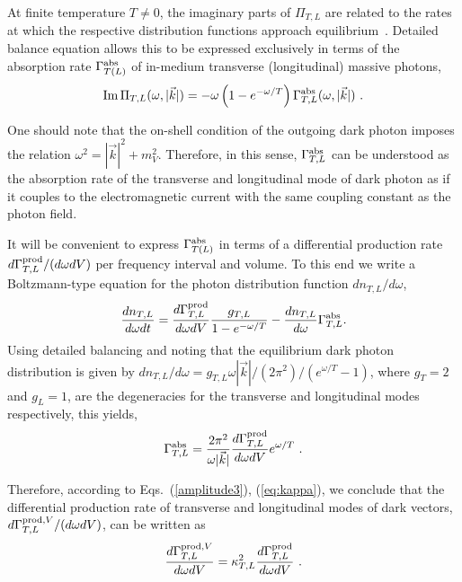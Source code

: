 \documentclass[12pt]{article}
\DeclareMathOperator{\imag}{Im}
\begin{document}
At finite temperature $T\neq 0$, the imaginary parts of $\Pi_{T,L}$
are related to the rates at which the respective distribution
functions approach equilibrium~\cite{Weldon:1983jn}. Detailed
balance equation allows this to be expressed exclusively in terms of the
absorption rate $\Gamma^{\rm abs}_{T(L)}$  of in-medium transverse (longitudinal) massive photons,
\begin{equation}\label{eq:impi}
\imag \Pi_{T,L} (\omega,|\vec k|) = -\omega\left(1-e^{-\omega/T}\right)\Gamma^{\rm abs}_{T,L}(\omega,|\vec k|) \ .
\end{equation}

One should note that the on-shell condition of the outgoing dark photon imposes the relation $\omega^2 = |\vec k|^2 + m_V^2$. Therefore, in this sense, $\Gamma^{\rm abs}_{T,L}$ can be understood as the absorption rate of the transverse and longitudinal mode of dark photon as if it couples to the electromagnetic current with the same coupling constant as the photon field. 

It will be convenient to express $\Gamma^{\rm abs}_{T(L)}$ in terms of a
differential production rate ${d\Gamma^{\rm prod}_{T,L}}/({d\omega dV})$ per
frequency interval and volume. To this end we write a Boltzmann-type
equation for the photon distribution function $dn_{T,L}/d\omega$,
%
\begin{equation}
  \frac{dn_{T,L}}{d\omega dt} = 
  \frac{d\Gamma^{\rm prod}_{T,L}}{d\omega dV}\frac{g_{T,L}}{1-e^{-\omega/T}} - \frac{dn_{T,L}}{d\omega} \Gamma^{\rm abs}_{T,L} .
\end{equation}
%
Using detailed balancing and noting that the equilibrium dark photon
distribution is given by $ dn_{T,L}/d\omega = g_{T,L}\omega |\vec
k|/(2\pi^2)/(e^{\omega/T} - 1)$, where $g_{T} = 2$ and $g_L = 1$, are the degeneracies for the transverse and longitudinal modes respectively, this yields,
\begin{equation}
\Gamma^{{\rm abs}}_{T,L} = \frac{2\pi^{2}}{\omega |\vec k|} \frac{d\Gamma^{{\rm prod}}_{T,L}}{d\omega dV}e^{\omega/T} \ .
\end{equation}

Therefore, according to Eqs.~(\ref{amplitude3}), (\ref{eq:kappa}), 
we conclude that the differential production rate of 
transverse and longitudinal modes of dark vectors, ${d\Gamma^{{\rm prod},V}_{T,L}}/(d\omega dV)$, can be written as
\begin{eqnarray}\label{eq:gammaV}
\frac{d\Gamma^{{\rm prod},V}_{T,L}}{d\omega dV} = \kappa_{T,L}^{2} \frac{d\Gamma^{\rm prod}_{T,L}}{d\omega dV} \ .
\label{GammaV}
\end{eqnarray}
\end{document}
